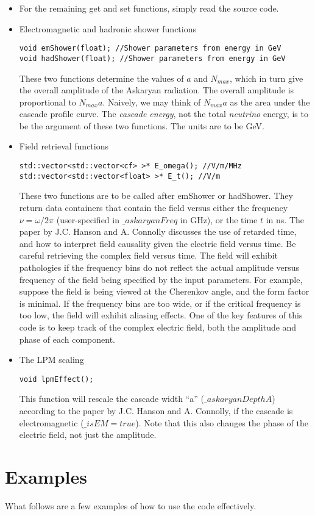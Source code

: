 \documentclass[10pt]{article}
\begin{document}
\begin{itemize}
\item For the remaining get and set functions, simply read the source code.
\item Electromagnetic and hadronic shower functions
\begin{verbatim}
void emShower(float); //Shower parameters from energy in GeV
void hadShower(float); //Shower parameters from energy in GeV
\end{verbatim}
These two functions determine the values of $a$ and $N_{max}$, which in turn give the overall amplitude of the Askaryan radiation.  The overall amplitude is proportional to $N_{max} a$.  Naively, we may think of $N_{max}a$ as the area under the cascade profile curve.  The \textit{cascade energy}, not the total \textit{neutrino} energy, is to be the argument of these two functions.  The units are to be GeV.
\item Field retrieval functions
\begin{verbatim}
std::vector<std::vector<cf> >* E_omega(); //V/m/MHz
std::vector<std::vector<float> >* E_t(); //V/m
\end{verbatim}
These two functions are to be called after emShower or hadShower.  They return data containers that contain the field versus either the frequency $\nu = \omega/2\pi$ (user-specified in $\_askaryanFreq$ in GHz), or the time $t$ in ns.  The paper by J.C. Hanson and A. Connolly discusses the use of retarded time, and how to interpret field causality given the electric field versus time.  Be careful retrieving the complex field versus time.  The field will exhibit pathologies if the frequency bins do not reflect the actual amplitude versus frequency of the field being specified by the input parameters.  For example, suppose the field is being viewed at the Cherenkov angle, and the form factor is minimal.  If the frequency bins are too wide, or if the critical frequency is too low, the field will exhibit aliasing effects.  One of the key features of this code is to keep track of the complex electric field, both the amplitude and phase of each component.
\item The LPM scaling
\begin{verbatim}
void lpmEffect();
\end{verbatim}
This function will rescale the cascade width ``a'' ($\_askaryanDepthA$) according to the paper by J.C. Hanson and A. Connolly, if the cascade is electromagnetic ($\_isEM = true$).  Note that this also changes the phase of the electric field, not just the amplitude.
\end{itemize}

\section{Examples}

What follows are a few examples of how to use the code effectively.
\end{document}
